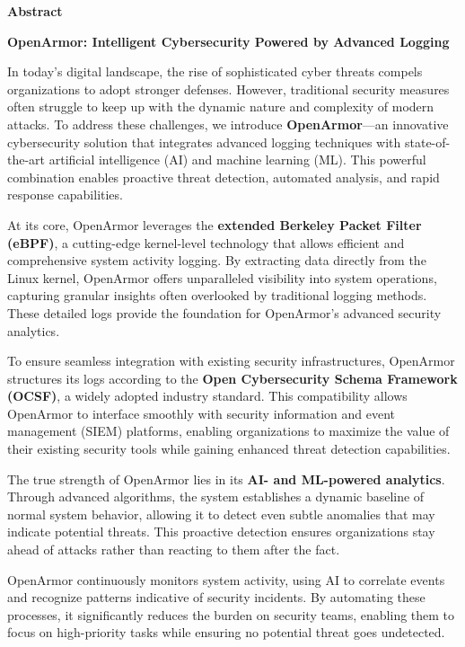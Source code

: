 \thispagestyle{empty}
\newpage
\cleardoublepage{}
{}
\begin{center}
{\Large \bf Abstract}\\
\end{center}
\vspace{10pt}

\textbf{OpenArmor: Intelligent Cybersecurity Powered by Advanced Logging}

In today’s digital landscape, the rise of sophisticated cyber threats compels organizations to adopt stronger defenses. However, traditional security measures often struggle to keep up with the dynamic nature and complexity of modern attacks. To address these challenges, we introduce \textbf{OpenArmor}—an innovative cybersecurity solution that integrates advanced logging techniques with state-of-the-art artificial intelligence (AI) and machine learning (ML). This powerful combination enables proactive threat detection, automated analysis, and rapid response capabilities.

At its core, OpenArmor leverages the \textbf{extended Berkeley Packet Filter (eBPF)}, a cutting-edge kernel-level technology that allows efficient and comprehensive system activity logging. By extracting data directly from the Linux kernel, OpenArmor offers unparalleled visibility into system operations, capturing granular insights often overlooked by traditional logging methods. These detailed logs provide the foundation for OpenArmor’s advanced security analytics.

To ensure seamless integration with existing security infrastructures, OpenArmor structures its logs according to the \textbf{Open Cybersecurity Schema Framework (OCSF)}, a widely adopted industry standard. This compatibility allows OpenArmor to interface smoothly with security information and event management (SIEM) platforms, enabling organizations to maximize the value of their existing security tools while gaining enhanced threat detection capabilities.

The true strength of OpenArmor lies in its \textbf{AI- and ML-powered analytics}. Through advanced algorithms, the system establishes a dynamic baseline of normal system behavior, allowing it to detect even subtle anomalies that may indicate potential threats. This proactive detection ensures organizations stay ahead of attacks rather than reacting to them after the fact.

OpenArmor continuously monitors system activity, using AI to correlate events and recognize patterns indicative of security incidents. By automating these processes, it significantly reduces the burden on security teams, enabling them to focus on high-priority tasks while ensuring no potential threat goes undetected.

